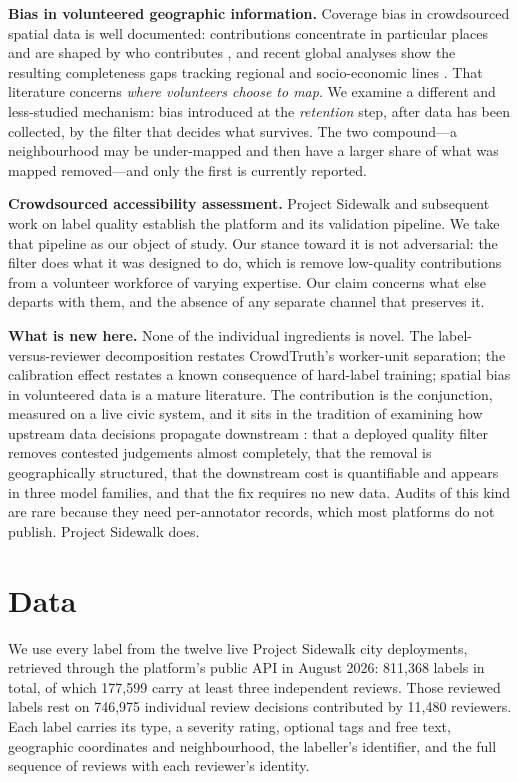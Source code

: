 \documentclass[sigconf]{acmart}
\begin{document}
\textbf{Bias in volunteered geographic information.} Coverage bias in
crowdsourced spatial data is well documented: contributions concentrate in
particular places and are shaped by who contributes \cite{haklay2010good,
quattrone2015bias}, and recent global analyses show the resulting completeness
gaps tracking regional and socio-economic lines \cite{herfort2023osm}. That
literature concerns \emph{where volunteers choose to map}. We examine a
different and less-studied mechanism: bias introduced at the \emph{retention}
step, after data has been collected, by the filter that decides what survives.
The two compound---a neighbourhood may be under-mapped and then have a larger
share of what was mapped removed---and only the first is currently reported.

\textbf{Crowdsourced accessibility assessment.} Project Sidewalk
\cite{saha2019projectsidewalk} and subsequent work on label quality
\cite{li2024labelaid} establish the platform and its validation pipeline. We
take that pipeline as our object of study. Our stance toward it is not
adversarial: the filter does what it was designed to do, which is remove
low-quality contributions from a volunteer workforce of varying expertise. Our
claim concerns what else departs with them, and the absence of any separate
channel that preserves it.

\textbf{What is new here.} None of the individual ingredients is novel. The
label-versus-reviewer decomposition restates CrowdTruth's worker-unit
separation; the calibration effect restates a known consequence of hard-label
training; spatial bias in volunteered data is a mature literature. The
contribution is the conjunction, measured on a live civic system, and it sits in
the tradition of examining how upstream data decisions propagate downstream
\cite{sambasivan2021cascades}: that a
deployed quality filter removes contested judgements almost completely, that
the removal is geographically structured, that the downstream cost is
quantifiable and appears in three model families, and that the fix requires no
new data. Audits of this kind are rare because they need per-annotator records,
which most platforms do not publish. Project Sidewalk does.

\section{Data}
\label{sec:data}

We use every label from the twelve live Project Sidewalk city deployments,
retrieved through the platform's public API in August 2026: 811{,}368 labels in
total, of which 177{,}599 carry at least three independent reviews. Those
reviewed labels rest on 746{,}975 individual review decisions contributed by
11{,}480 reviewers. Each label carries its type, a severity rating, optional
tags and free text, geographic coordinates and neighbourhood, the labeller's
identifier, and the full sequence of reviews with each reviewer's identity.
\end{document}
